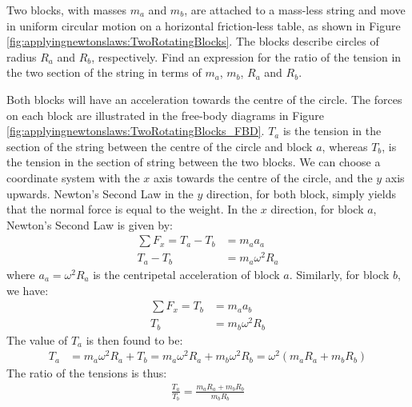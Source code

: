 \question Two blocks, with masses $m_a$ and $m_b$, are attached to a mass-less string and move in uniform circular motion on a horizontal friction-less table, as shown in Figure \ref{fig:applyingnewtonslaws:TwoRotatingBlocks}. The blocks describe circles of radius $R_a$ and $R_b$, respectively. Find an expression for the ratio of the tension in the two section of the string in terms of $m_a$, $m_b$, $R_a$ and $R_b$. 
\begin{solution}
Both blocks will have an acceleration towards the centre of the circle. The forces on each block are illustrated in the free-body diagrams in Figure \ref{fig:applyingnewtonslaws:TwoRotatingBlocks_FBD}.
$T_a$ is the tension in the section of the string between the centre of the circle and block $a$, whereas $T_b$, is  the tension in the section of string between the two blocks. We can choose a coordinate system with the $x$ axis towards the centre of the circle, and the $y$ axis upwards. Newton's Second Law in the $y$ direction, for both block, simply yields that the normal force is equal to the weight. In the $x$ direction, for block $a$, Newton's Second Law is given by:
\begin{align*}
\sum F_x = T_a-T_b&=m_aa_a\\
T_a-T_b&=m_a\omega^2R_a
\end{align*}
where $a_a=\omega^2R_a$ is the centripetal acceleration of block $a$. Similarly, for block $b$, we have:
\begin{align*}
\sum F_x = T_b&=m_aa_b\\
T_b&=m_b\omega^2R_b
\end{align*}
The value of $T_a$ is then found to be:
\begin{align*}
T_a &=m_a\omega^2R_a+T_b=m_a\omega^2R_a+m_b\omega^2R_b=\omega^2(m_aR_a+m_bR_b)
\end{align*}
The ratio of the tensions is thus:
\begin{align*}
\frac{T_a}{T_b}=\frac{m_aR_a+m_bR_b}{m_bR_b}
\end{align*}
\end{solution}

